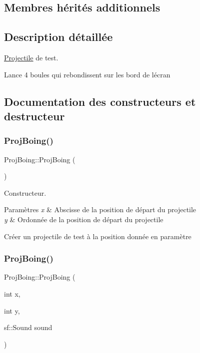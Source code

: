 \subsection*{Membres hérités additionnels}


\subsection{Description détaillée}
\hyperlink{class_projectile}{Projectile} de test. 

Lance 4 boules qui rebondissent sur les bord de l\textquotesingle{}écran 

\subsection{Documentation des constructeurs et destructeur}
\mbox{\label{class_proj_boing_aebaef3b6474750c645ccd633b03bb9ce}} 
\subsubsection{\texorpdfstring{Proj\+Boing()}{ProjBoing()}\hspace{0.1cm}{\footnotesize\ttfamily [1/2]}}
{\footnotesize\ttfamily Proj\+Boing\+::\+Proj\+Boing (\begin{DoxyParamCaption}{ }\end{DoxyParamCaption})}



Constructeur. 


\begin{DoxyParams}{Paramètres}
{\em x} & Abscisse de la position de départ du projectile \\
\hline
{\em y} & Ordonnée de la position de départ du projectile\\
\hline
\end{DoxyParams}
Créer un projectile de test à la position donnée en paramètre \mbox{\label{class_proj_boing_ad2f963465fff3fae7aeeeda8546afe09}} 
\subsubsection{\texorpdfstring{Proj\+Boing()}{ProjBoing()}\hspace{0.1cm}{\footnotesize\ttfamily [2/2]}}
{\footnotesize\ttfamily Proj\+Boing\+::\+Proj\+Boing (\begin{DoxyParamCaption}\item[{int}]{x,  }\item[{int}]{y,  }\item[{sf\+::\+Sound}]{sound }\end{DoxyParamCaption})}

